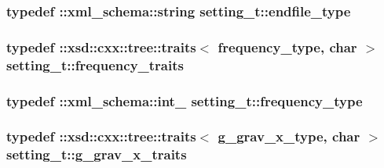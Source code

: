 \subsubsection[{\texorpdfstring{endfile\+\_\+type}{endfile_type}}]{\setlength{\rightskip}{0pt plus 5cm}typedef \+::{\bf xml\+\_\+schema\+::string} {\bf setting\+\_\+t\+::endfile\+\_\+type}}\hypertarget{classsetting__t_a395877994cdfcf2ea063a56aed90cf01}{}\label{classsetting__t_a395877994cdfcf2ea063a56aed90cf01}
\subsubsection[{\texorpdfstring{frequency\+\_\+traits}{frequency_traits}}]{\setlength{\rightskip}{0pt plus 5cm}typedef \+::xsd\+::cxx\+::tree\+::traits$<$ {\bf frequency\+\_\+type}, char $>$ {\bf setting\+\_\+t\+::frequency\+\_\+traits}}\hypertarget{classsetting__t_a948d945ce65d7779e6820f6de48d0613}{}\label{classsetting__t_a948d945ce65d7779e6820f6de48d0613}
\subsubsection[{\texorpdfstring{frequency\+\_\+type}{frequency_type}}]{\setlength{\rightskip}{0pt plus 5cm}typedef \+::{\bf xml\+\_\+schema\+::int\+\_\+} {\bf setting\+\_\+t\+::frequency\+\_\+type}}\hypertarget{classsetting__t_af0353930c8d9e0e19ee57943f2d130ee}{}\label{classsetting__t_af0353930c8d9e0e19ee57943f2d130ee}
\subsubsection[{\texorpdfstring{g\+\_\+grav\+\_\+x\+\_\+traits}{g_grav_x_traits}}]{\setlength{\rightskip}{0pt plus 5cm}typedef \+::xsd\+::cxx\+::tree\+::traits$<$ {\bf g\+\_\+grav\+\_\+x\+\_\+type}, char $>$ {\bf setting\+\_\+t\+::g\+\_\+grav\+\_\+x\+\_\+traits}}\hypertarget{classsetting__t_a6a6c41b916afaf5875cef8b3725c41cf}{}\label{classsetting__t_a6a6c41b916afaf5875cef8b3725c41cf}
